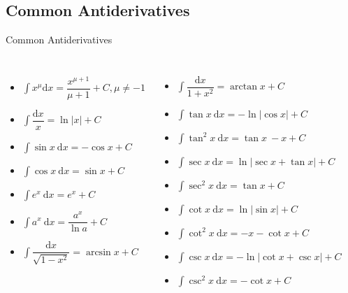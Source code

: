 \documentclass{beamer}
\begin{document}
    \subsection{Common Antiderivatives}
    \begin{frame}[t]{Common Antiderivatives}
        \begin{columns}[c]
            \begin{itemize}
                \item $\int x^{\mu} \mathrm{d}x=\dfrac{x^{\mu+1}}{\mu+1}+C, \mu \neq-1$
                \item $\int \dfrac{\mathrm{d}x}{x}=\ln |x|+C$
                \item $\int \sin x\ \mathrm{d}x=-\cos x+C$
                \item $\int \cos x\ \mathrm{d}x=\sin x+C$
                \item $\int e^{x}\ \mathrm{d}x=e^{x}+C$
                \item $\int a^{x}\ \mathrm{d}x=\dfrac{a^x}{\ln a}+C$
                \item $\int \dfrac{\mathrm{d}x}{\sqrt{1-x^{2}}}=\arcsin x+C$
            \end{itemize}
        
            \begin{itemize}
                \item $\int \dfrac{\mathrm{d}x}{1+x^{2}}=\arctan x+C$
                \item $\int \tan x\ \mathrm{d}x=-\ln\left| \cos x \right|+C$
                \item $\int \tan^2 x\ \mathrm{d}x=\tan x\ -x+C$
                \item $\int \sec x\ \mathrm{d}x=\ln\left|\sec x +\tan x\right|+C$
                \item $\int \sec^2 x\ \mathrm{d}x=\tan x+C$
                \item $\int \cot x\ \mathrm{d}x=\ln\left| \sin x\right| +C$ 
                \item $\int \cot^2 x\ \mathrm{d}x=-x-\cot x +C$  
                \item $\int \csc x \ \mathrm{d}x=-\ln\left|\cot x+ \csc x\right|+C$
                \item $\int \csc^2 x\ \mathrm{d}x=-\cot x+C$
            \end{itemize}
        \end{columns}
    \end{frame}
\end{document}
